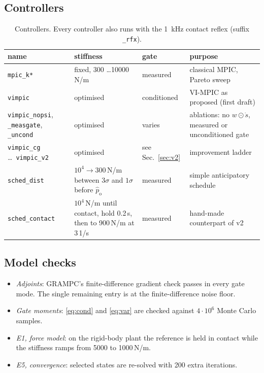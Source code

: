 \documentclass[11pt,a4paper]{article}
\newcommand{\phat}{\hat{p}_{\mathrm{o}}}
\begin{document}
\subsection{Controllers}
\begin{table}[!htbp]
\centering\small
\caption{Controllers. Every controller also runs with the \SI{1}{kHz} contact reflex (suffix \texttt{\_rfx}).}
\label{tab:controllers}
\begin{tabularx}{\linewidth}{@{}>{\raggedright\arraybackslash}p{3.4cm}>{\raggedright\arraybackslash}X>{\raggedright\arraybackslash}p{1.9cm}>{\raggedright\arraybackslash}X@{}}
\toprule
name & stiffness & gate & purpose \\
\midrule
\texttt{mpic\_k*} & fixed, 300 \dots 10000\,N/m & measured & classical MPIC, Pareto sweep \\
\texttt{vimpic} & optimised & conditioned & VI-MPIC as proposed (first draft) \\
\texttt{vimpic\_nopsi}, \texttt{\_measgate}, \texttt{\_uncond} & optimised & varies & ablations: no $w\odot\dot s$, measured or unconditioned gate \\
\texttt{vimpic\_cg} \dots\ \texttt{vimpic\_v2} & optimised & see Sec.~\ref{sec:v2} & improvement ladder \\
\texttt{sched\_dist} & $10^4\to300$\,N/m between $3\sigma$ and $1\sigma$ before $\phat$ & measured & simple anticipatory schedule \\
\texttt{sched\_contact} & $10^4$\,N/m until contact, hold 0.2\,s, then to 900\,N/m at 3\,1/s & measured & hand-made counterpart of v2 \\
\bottomrule
\end{tabularx}
\end{table}

\subsection{Model checks}\label{sec:checks}
\begin{itemize}[leftmargin=14pt]
\item \emph{Adjoints}: GRAMPC's finite-difference gradient check passes in every gate mode. The single
  remaining entry is at the finite-difference noise floor.
\item \emph{Gate moments}: \eqref{eq:cond} and \eqref{eq:var} are checked against $4\cdot10^6$ Monte Carlo
  samples.
\item \emph{E1, force model}: on the rigid-body plant the reference is held in contact while the
  stiffness ramps from 5000 to 1000\,N/m.
\item \emph{E5, convergence}: selected states are re-solved with 200 extra iterations.
\end{itemize}
\end{document}
